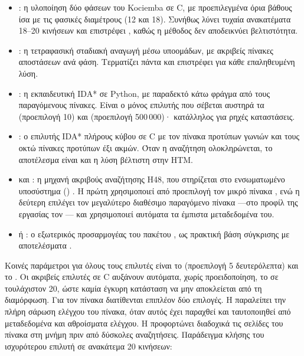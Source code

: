 \begin{itemize}
\item {}: η υλοποίηση δύο φάσεων του Kociemba σε C, με προεπιλεγμένα όρια βάθους ίσα με τις φασικές διαμέτρους (12 και 18). Συνήθως λύνει τυχαία ανακατέματα 18--20 κινήσεων και επιστρέφει , καθώς η μέθοδος δεν αποδεικνύει βελτιστότητα.
\item {}: η τετραφασική σταδιακή αναγωγή μέσω υποομάδων, με ακριβείς πίνακες αποστάσεων ανά φάση. Τερματίζει πάντα και επιστρέφει  για κάθε επαληθευμένη λύση.
\item {}: η εκπαιδευτική IDA* σε Python, με παραδεκτό κάτω φράγμα από τους παραγόμενους πίνακες. Είναι ο μόνος επιλυτής που σέβεται αυστηρά τα  (προεπιλογή 10) και  (προεπιλογή 500\,000)· κατάλληλος για ρηχές καταστάσεις.
\item {}: ο επιλυτής IDA* πλήρους κύβου σε C με τον πίνακα προτύπων γωνιών και τους οκτώ πίνακες προτύπων έξι ακμών. Όταν η αναζήτηση ολοκληρώνεται, το αποτέλεσμα είναι  και η λύση βέλτιστη στην HTM.
\item {} και : η μηχανή ακριβούς αναζήτησης H48, που στηρίζεται στο ενσωματωμένο υποσύστημα ()  \cite{trontoNissyCoreH48}. Η πρώτη χρησιμοποιεί από προεπιλογή τον μικρό πίνακα , ενώ η δεύτερη επιλέγει τον μεγαλύτερο διαθέσιμο παραγόμενο πίνακα —στο προφίλ της εργασίας τον — και χρησιμοποιεί αυτόματα τα έμπιστα μεταδεδομένα του.
\item {} ή : ο εξωτερικός προσαρμογέας του πακέτου , ως πρακτική βάση σύγκρισης με αποτελέσματα .
\end{itemize}

Κοινές παράμετροι για όλους τους επιλυτές είναι το  (προεπιλογή 5 δευτερόλεπτα) και το . Οι ακριβείς επιλυτές σε C αυξάνουν αυτόματα, χωρίς προειδοποίηση, το  σε τουλάχιστον 20, ώστε καμία έγκυρη κατάσταση να μην αποκλείεται από τη διαμόρφωση. Για τον πίνακα  διατίθενται επιπλέον δύο επιλογές. Η  παραλείπει την πλήρη σάρωση ελέγχου του πίνακα, όταν αυτός έχει παραχθεί και ταυτοποιηθεί από μεταδεδομένα και αθροίσματα ελέγχου. Η  προφορτώνει διαδοχικά τις σελίδες του πίνακα στη μνήμη πριν από δύσκολες αναζητήσεις. Παράδειγμα κλήσης του ισχυρότερου επιλυτή σε ανακάτεμα 20 κινήσεων:

